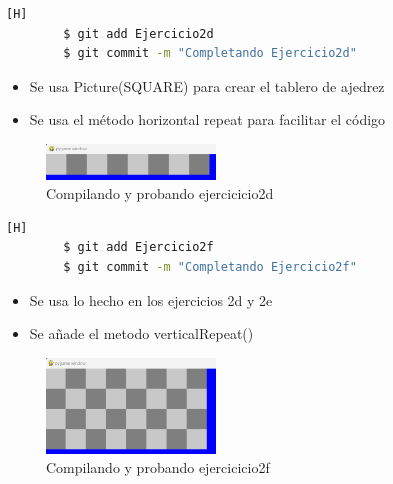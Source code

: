 \documentclass{article}
\begin{document}
	\begin{lstlisting}[language=bash,caption={Completando Ejercicio2d}][H]
		$ git add Ejercicio2d
		$ git commit -m "Completando Ejercicio2d"			
	\end{lstlisting}
	
	\begin{itemize}	
		\item Se usa Picture(SQUARE) para crear el tablero de ajedrez
  		\item Se usa el método horizontal repeat para facilitar el código
	\end{itemize}
	\begin{figure}[H]
		\centering
		\includegraphics[width=0.4\textwidth,keepaspectratio]{img/2d.png}
		\caption{Compilando y probando ejercicicio2d}
	\end{figure}

	\begin{lstlisting}[language=bash,caption={Completando Ejercicio2f}][H]
		$ git add Ejercicio2f
		$ git commit -m "Completando Ejercicio2f"			
	\end{lstlisting}
	
	\begin{itemize}	
		\item Se usa lo hecho en los ejercicios 2d y 2e   
  		\item Se añade el metodo verticalRepeat()
	\end{itemize}
	\begin{figure}[H]
		\centering
		\includegraphics[width=0.4\textwidth,keepaspectratio]{img/2f.png}
		\caption{Compilando y probando ejercicicio2f}
	\end{figure}
\end{document}
